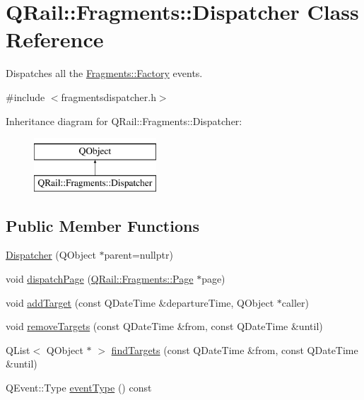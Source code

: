 \hypertarget{classQRail_1_1Fragments_1_1Dispatcher}{}\section{Q\+Rail\+::Fragments\+::Dispatcher Class Reference}
\label{classQRail_1_1Fragments_1_1Dispatcher}


Dispatches all the \mbox{\hyperlink{classQRail_1_1Fragments_1_1Factory}{Fragments\+::\+Factory}} events.  




{\ttfamily \#include $<$fragmentsdispatcher.\+h$>$}

Inheritance diagram for Q\+Rail\+::Fragments\+::Dispatcher\+:\begin{figure}[H]
\begin{center}
\leavevmode
\includegraphics[height=2.000000cm]{classQRail_1_1Fragments_1_1Dispatcher}
\end{center}
\end{figure}
\subsection*{Public Member Functions}
\begin{DoxyCompactItemize}
\item 
\mbox{\hyperlink{classQRail_1_1Fragments_1_1Dispatcher_a94fd3786408f4686957fbfe1a7ce02b4}{Dispatcher}} (Q\+Object $\ast$parent=nullptr)
\item 
void \mbox{\hyperlink{classQRail_1_1Fragments_1_1Dispatcher_a8fb45565510e58c75c23131c55127703}{dispatch\+Page}} (\mbox{\hyperlink{classQRail_1_1Fragments_1_1Page}{Q\+Rail\+::\+Fragments\+::\+Page}} $\ast$page)
\item 
void \mbox{\hyperlink{classQRail_1_1Fragments_1_1Dispatcher_a5fcac7c9a26145f0d1907d23c18c60ac}{add\+Target}} (const Q\+Date\+Time \&departure\+Time, Q\+Object $\ast$caller)
\item 
void \mbox{\hyperlink{classQRail_1_1Fragments_1_1Dispatcher_a21d4df9c73acc71f39b5323d79439896}{remove\+Targets}} (const Q\+Date\+Time \&from, const Q\+Date\+Time \&until)
\item 
Q\+List$<$ Q\+Object $\ast$ $>$ \mbox{\hyperlink{classQRail_1_1Fragments_1_1Dispatcher_a45cd97a9172b52a85e40fd941ae8d7ad}{find\+Targets}} (const Q\+Date\+Time \&from, const Q\+Date\+Time \&until)
\item 
Q\+Event\+::\+Type \mbox{\hyperlink{classQRail_1_1Fragments_1_1Dispatcher_acf343b76ab5b5b38c855122052c4f092}{event\+Type}} () const
\end{DoxyCompactItemize}


